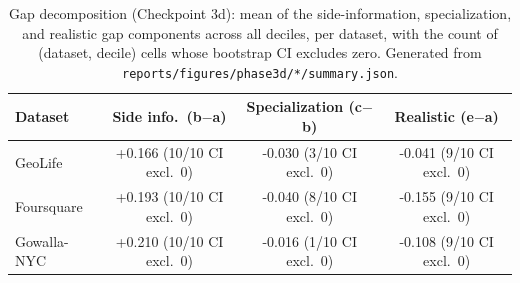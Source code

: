 \begin{table}[t]
\centering
\caption{Gap decomposition (Checkpoint 3d): mean of the side-information, specialization, and realistic gap components across all deciles, per dataset, with the count of (dataset, decile) cells whose bootstrap CI excludes zero. Generated from \texttt{reports/figures/phase3d/*/summary.json}.}
\label{tab:gap-decomposition}
\small
\begin{tabular}{@{}lccc@{}}
\toprule
Dataset & Side info.\ (b$-$a) & Specialization (c$-$b) & Realistic (e$-$a) \\
\midrule
GeoLife & +0.166 (10/10 CI excl.\ 0) & -0.030 (3/10 CI excl.\ 0) & -0.041 (9/10 CI excl.\ 0) \\
Foursquare & +0.193 (10/10 CI excl.\ 0) & -0.040 (8/10 CI excl.\ 0) & -0.155 (9/10 CI excl.\ 0) \\
Gowalla-NYC & +0.210 (10/10 CI excl.\ 0) & -0.016 (1/10 CI excl.\ 0) & -0.108 (9/10 CI excl.\ 0) \\
\bottomrule
\end{tabular}
\end{table}
